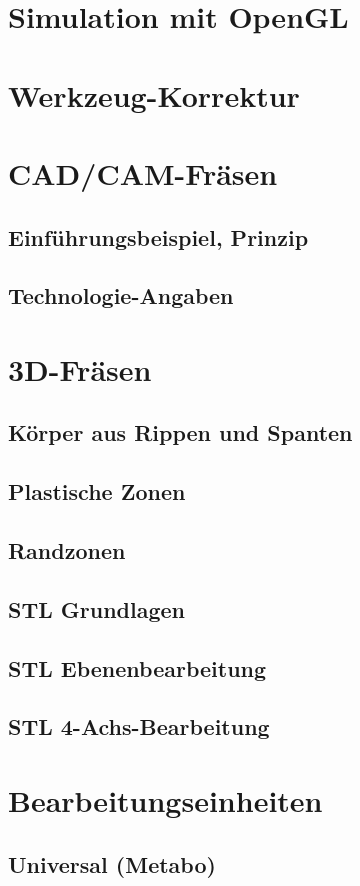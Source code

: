 \documentclass[a5paper]{book}
\begin{document}
	\section{Simulation mit OpenGL} 
	\section{Werkzeug-Korrektur} 
	\section{CAD/CAM-Fräsen} 
		\subsection{Einführungsbeispiel, Prinzip} 
		\subsection{Technologie-Angaben} 
	\section{3D-Fräsen}
		\subsection{Körper aus Rippen und Spanten} 
		\subsection{Plastische Zonen} 
		\subsection{Randzonen} 
		\subsection{STL Grundlagen} 
		\subsection{STL Ebenenbearbeitung} 
		\subsection{STL 4-Achs-Bearbeitung}
	\section{Bearbeitungseinheiten} 
		\subsection{Universal (Metabo)} 
\end{document}
